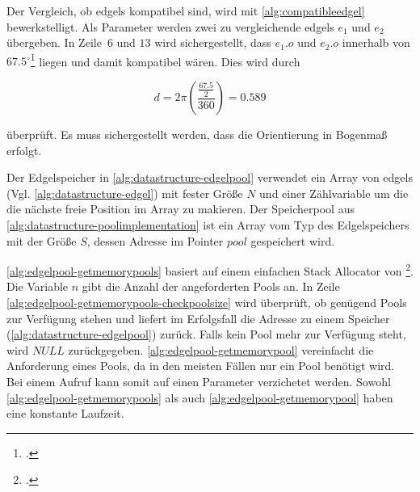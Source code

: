 

Der Vergleich, ob \gls{edgels} kompatibel sind, wird mit \autoref{alg:compatibleedgel} bewerkstelligt. Als Parameter
 werden zwei zu vergleichende \gls{edgels} $e_1$ und $e_2$ übergeben. In Zeile~$6$ und $13$ wird sichergestellt, dass
 $e_1.o$ und $e_2.o$ innerhalb von $67.5^\circ$\footcite[Vgl.][S.~417]{clarke96} liegen und damit kompatibel wären.
 Dies wird durch

\begin{equation}
	d = 2 \pi \left( \frac{ \frac{67.5}{2} }{360} \right) = 0.589
\end{equation}

überprüft. Es muss sichergestellt werden, dass die Orientierung in Bogenmaß erfolgt.

Der Edgelspeicher in \autoref{alg:datastructure-edgelpool} verwendet ein Array von \gls{edgels}
 (Vgl. \autoref{alg:datastructure-edgel}) mit fester Größe $N$ und einer Zählvariable um die die nächste freie Position
 im Array zu makieren. Der Speicherpool aus \autoref{alg:datastructure-poolimplementation} ist ein Array vom Typ des
 Edgelspeichers mit der Größe $S$, dessen Adresse im Pointer $\mathit{pool}$ gespeichert wird.



\autoref{alg:edgelpool-getmemorypools} basiert auf einem einfachen Stack Allocator von
 \citeauthor{kr}\footcite[Vgl.][S.~100--104]{kr}. Die Variable $n$ gibt die Anzahl der angeforderten Pools an. In Zeile
 \ref{alg:edgelpool-getmemorypools-checkpoolsize} wird überprüft, ob genügend Pools zur Verfügung stehen und liefert im
 Erfolgsfall die Adresse zu einem Speicher (\autoref{alg:datastructure-edgelpool}) zurück. Falls kein Pool mehr zur
 Verfügung steht, wird $\mathit{NULL}$ zurückgegeben. \autoref{alg:edgelpool-getmemorypool} vereinfacht die Anforderung
 eines Pools, da in den meisten Fällen nur ein Pool benötigt wird. Bei einem Aufruf kann somit auf einen Parameter
 verzichetet werden. Sowohl \autoref{alg:edgelpool-getmemorypools} als auch \autoref{alg:edgelpool-getmemorypool} haben
 eine konstante Laufzeit.





